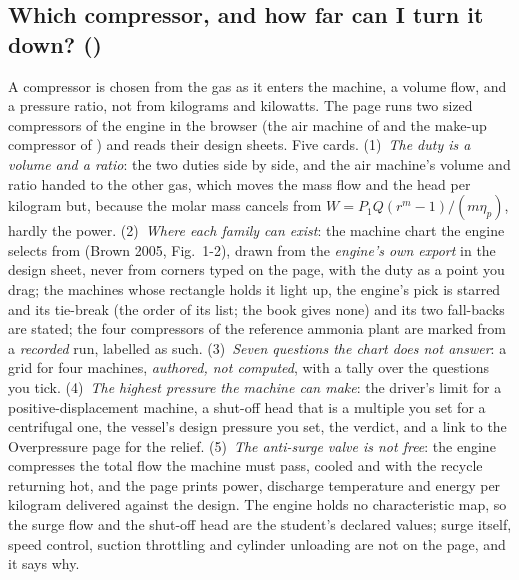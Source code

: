 \documentclass[11pt,a4paper]{article}
\begin{document}
\subsection*{Which compressor, and how far can I turn it down? \quad()}\label{sec:edu-compressor-choice}
A compressor is chosen from the gas as it enters the machine, a volume flow, and
a pressure ratio, not from kilograms and kilowatts.  The page runs two sized
compressors of the engine in the browser (the air machine of
 and the make-up compressor of
) and reads their design sheets.  Five cards.
(1)~\emph{The duty is a volume and a ratio}: the two duties side by side, and the
air machine's volume and ratio handed to the other gas, which moves the mass flow
and the head per kilogram but, because the molar mass cancels from
$W=P_1Q(r^{m}-1)/(m\eta_p)$, hardly the power.  (2)~\emph{Where each family can
exist}: the machine chart the engine selects from (Brown 2005, Fig.~1-2), drawn
from the \emph{engine's own export} in the design sheet, never from corners typed
on the page, with the duty as a point you drag; the machines whose rectangle holds
it light up, the engine's pick is starred and its tie-break (the order of its
list; the book gives none) and its two fall-backs are stated; the four compressors
of the reference ammonia plant are marked from a \emph{recorded} run, labelled as
such.  (3)~\emph{Seven questions the chart does not answer}: a grid for four
machines, \emph{authored, not computed}, with a tally over the questions you
tick.  (4)~\emph{The highest pressure the machine can make}: the driver's limit
for a positive-displacement machine, a shut-off head that is a multiple you set
for a centrifugal one, the vessel's design pressure you set, the verdict, and a
link to the Overpressure page for the relief.  (5)~\emph{The anti-surge valve is
not free}: the engine compresses the total flow the machine must pass, cooled and
with the recycle returning hot, and the page prints power, discharge temperature
and energy per kilogram delivered against the design.  The engine holds no
characteristic map, so the surge flow and the shut-off head are the student's
declared values; surge itself, speed control, suction throttling and cylinder
unloading are not on the page, and it says why.
\end{document}
